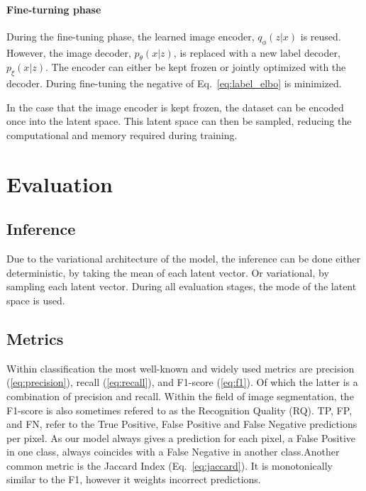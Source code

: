 \paragraph*{Fine-turning phase} During the fine-tuning phase, the learned image encoder, $q_\phi(z|x)$ is reused. However, the image decoder, $p_\theta(x|z)$, is replaced with a new label decoder, $p_\xi(x|z)$. The encoder can either be kept frozen or jointly optimized with the decoder. During fine-tuning the negative of Eq.~\ref{eq:label_elbo} is minimized.

In the case that the image encoder is kept frozen, the dataset can be encoded once into the latent space. This latent space can then be sampled, reducing the computational and memory required during training.

\section{Evaluation}
\subsection{Inference}
Due to the variational architecture of the model, the inference can be done either deterministic, by taking the mean of each latent vector. Or variational, by sampling each latent vector. During all evaluation stages, the mode of the latent space is used.

\subsection{Metrics}
Within classification the most well-known and widely used metrics are precision (\ref{eq:precision}), recall (\ref{eq:recall}), and F1-score (\ref{eq:f1})\cite{rijsbergen1979information}. Of which the latter is a combination of precision and recall. Within the field of image segmentation, the F1-score is also sometimes refered to as the Recognition Quality (RQ). TP, FP, and FN, refer to the True Positive, False Positive and False Negative predictions per pixel. As our model always gives a prediction for each pixel, a False Positive in one class, always coincides with a False Negative in another class.Another common metric is the Jaccard Index (Eq.~\ref{eq:jaccard}). It is monotonically similar to the F1, however it weights incorrect predictions.

